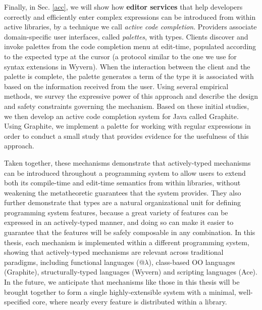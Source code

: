 Finally, in Sec. \ref{acc}, we will show how \textbf{editor services} that help developers correctly and efficiently enter complex expressions can be introduced from within active libraries, by a technique we call \emph{active code completion}. Providers associate
domain-specific user interfaces, called \emph{palettes}, with types. Clients discover and invoke palettes from the code completion menu at edit-time, populated according to the expected type at the cursor (a protocol similar to the one we use for syntax extensions in Wyvern). When the interaction between the client and the palette is complete, the palette generates a term of the type it is associated with based on the information received from the user. Using several empirical
methods, we survey\- the expressive power of this approach and describe the design and safety constraints governing
the mechanism. Based on these initial studies, we then develop an active code completion system for Java called Graphite. Using Graphite,
we implement a palette for working with regular expressions in order to conduct a small study that provides evidence for the usefulness of this approach.

Taken together, these mechanisms demonstrate that actively-typed mechanisms can be introduced throughout a programming system to allow users to extend both its compile-time and edit-time semantics from within libraries, without  weakening the metatheoretic guarantees that the system provides. They also further demonstrate that types are a natural organizational unit for defining programming system features, because a great variety of features can be expressed in an actively-typed manner, and doing so can make it easier to guarantee that the features will be safely composable in any combination. In this thesis, each mechanism is  implemented within a different programming system, showing that actively-typed mechanisms are relevant across traditional paradigms, including functional languages (@$\lambda$), class-based OO languages (Graphite), structurally-typed languages (Wyvern) and scripting languages (Ace). In the future, we anticipate that mechanisms like those in this thesis will be brought together to form a single highly-extensible system with a minimal, well-specified core, where nearly every feature is distributed within a library. 

